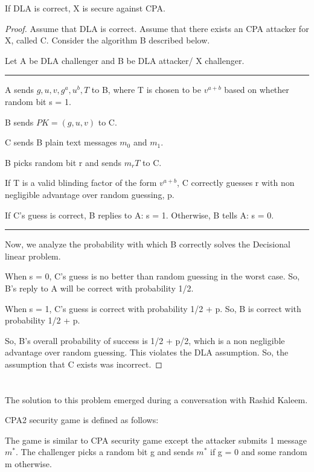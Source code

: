 \documentclass[10pt]{amsart}
\begin{document}
\begin{thm}
If DLA is correct, X is secure against CPA.
\end{thm}
\begin{proof}
Assume that DLA is correct. Assume that there exists an CPA attacker for X, called C. Consider the algorithm B described below.

Let A be DLA challenger and B be DLA attacker/ X challenger.

\hrule
A sends $g, u, v, g^{a}, u^{b}, T$ to B, where T is chosen to be $v^{a+b}$ based on whether random bit s = 1.

B sends $PK = (g, u, v)$ to C.

C sends B plain text messages $m_{0}$ and $m_{1}$.

B picks random bit r and sends $m_{r}T$ to C.

If T is a valid blinding factor of the form $v^{a+b}$, C correctly guesses r with non negligible advantage over random guessing, p.

If C's guess is correct, B replies to A: s = 1. Otherwise, B tells A: s = 0.

\hrule

Now, we analyze the probability with which B correctly solves the Decisional linear problem.

When s = 0, C's guess is no better than random guessing in the worst case. So, B's reply to A will be correct with probability 1/2.

When s = 1, C's guess is correct with probability 1/2 + p. So, B is correct with probability 1/2 + p.

So, B's overall probability of success is 1/2 + p/2, which is a non negligible advantage over random guessing. This violates the DLA assumption. So, the assumption that C exists was incorrect.
\end{proof}

\section{}
\begin{ack}
 The solution to this problem emerged during a conversation with Rashid Kaleem.
\end{ack}


\begin{defn}
CPA2 security game is defined as follows:

The game is similar to CPA security game except the attacker submits 1 message $m^{*}$. The challenger picks a random bit g and sends $m^{*}$ if g = 0 and some random m otherwise.
\end{defn}
\end{document}
